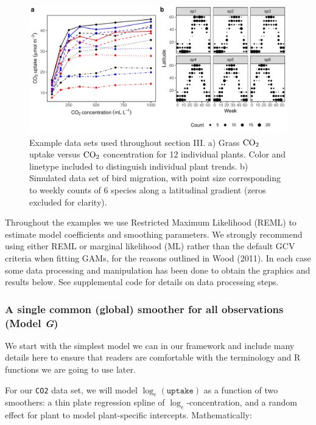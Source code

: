 \documentclass[12pt]{article}
\begin{document}
\begin{figure}
\includegraphics[width=\linewidth]{../figures/vis_data-1} \caption{\label{fig:vis_data}Example data sets used throughout section III. a) Grass $\text{CO}\textsubscript{2}$ uptake versus $\text{CO}\textsubscript{2}$ concentration for 12 individual plants. Color and linetype included to distinguish individual plant trends. b) Simulated data set of bird migration, with point size corresponding to weekly counts of 6 species along a latitudinal gradient (zeros excluded for clarity). }\label{fig:vis_data}
\end{figure}

Throughout the examples we use Restricted Maximum Likelihood (REML) to
estimate model coefficients and smoothing parameters. We strongly
recommend using either REML or marginal likelihood (ML) rather than the
default GCV criteria when fitting GAMs, for the reasons outlined in Wood
(2011). In each case some data processing and manipulation has been done
to obtain the graphics and results below. See supplemental code for
details on data processing steps.

\subsubsection{\texorpdfstring{A single common (global) smoother for all
observations (Model
\emph{G})}{A single common (global) smoother for all observations (Model G)}}\label{a-single-common-global-smoother-for-all-observations-model-g}

We start with the simplest model we can in our framework and include
many details here to ensure that readers are comfortable with the
terminology and R functions we are going to use later.

For our \texttt{CO2} data set, we will model \(\log_e(\texttt{uptake})\)
as a function of two smoothers: a thin plate regression spline of
\(\log_e\)-concentration, and a random effect for plant to model
plant-specific intercepts. Mathematically:
\end{document}
